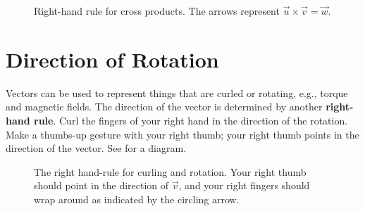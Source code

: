 \begin{figure}[ht] \label{fig:cross-right-hand-rule}
    \centering
    
    \caption{
        Right-hand rule for cross products.
        The arrows represent \(\vec{u} \times \vec{v} = \vec{w}\).
    }
\end{figure}

\section{Direction of Rotation} \label{sec:direction-of-rotation}

Vectors can be used to represent things that are curled or rotating,
e.g., torque and magnetic fields.
The direction of the vector is determined by another \textbf{right-hand rule}.
Curl the fingers of your right hand in the direction of the rotation.
Make a thumbs-up gesture with your right thumb;
your right thumb points in the direction of the vector.
See  for a diagram.

\begin{figure}[ht] \label{fig:curl-right-hand-rule}
    \centering
    
    \caption{
        The right hand-rule for curling and rotation.
        Your right thumb should point in the direction of \(\vec{v}\),
        and your right fingers should wrap around as indicated by the
        circling arrow.
    }
\end{figure}
